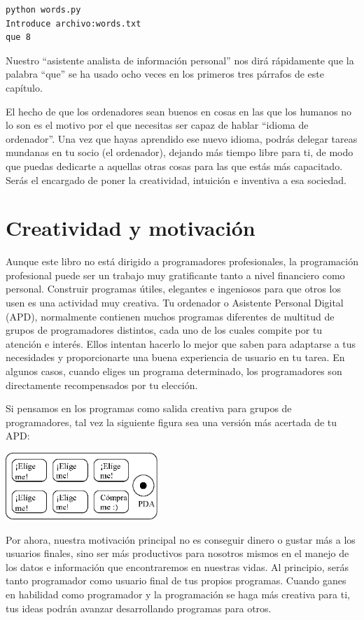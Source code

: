 \beforeverb
\begin{verbatim}
python words.py
Introduce archivo:words.txt
que 8
\end{verbatim}
\afterverb
%
Nuestro ``asistente analista de información personal'' nos dirá
rápidamente que la palabra ``que'' se ha usado ocho veces en los
primeros tres párrafos de este capítulo.

El hecho de que los ordenadores sean buenos en cosas
en las que los humanos no lo son es el motivo por el que necesitas
ser capaz de hablar ``idioma de ordenador''. Una vez que hayas
aprendido ese nuevo idioma, podrás delegar tareas mundanas
en tu socio (el ordenador), dejando más tiempo libre
para ti, de modo que puedas dedicarte a aquellas otras cosas
para las que estás más capacitado. Serás el encargado
de poner la creatividad, intuición e inventiva a esa
sociedad.

\section{Creatividad y motivación}

Aunque este libro no está dirigido a programadores profesionales, la programación
profesional puede ser un trabajo muy gratificante tanto a nivel financiero como personal.
Construir programas útiles, elegantes e ingeniosos para que otros los usen
es una actividad muy creativa. Tu ordenador o Asistente Personal Digital (APD),
normalmente contienen muchos programas diferentes de multitud de grupos de programadores
distintos, cada uno de los cuales compite por tu atención e interés.
Ellos intentan hacerlo lo mejor que saben para adaptarse a tus necesidades y proporcionarte
una buena experiencia de usuario en tu tarea. En algunos casos, cuando eliges un programa
determinado, los programadores son directamente recompensados por tu elección.

Si pensamos en los programas como salida creativa para grupos de programadores,
tal vez la siguiente figura sea una versión más acertada de tu APD:

\beforefig
\centerline{\includegraphics[height=1.00in]{figs2/pda2.eps}}
\afterfig

Por ahora, nuestra motivación principal no es conseguir dinero o gustar más a los usuarios
finales, sino ser más productivos para nosotros mismos en el manejo de los datos e
información que encontraremos en nuestras vidas.
Al principio, serás tanto programador como usuario final de tus propios programas.
Cuando ganes en habilidad como programador y la programación se haga más creativa para ti,
tus ideas podrán avanzar desarrollando programas para otros.

